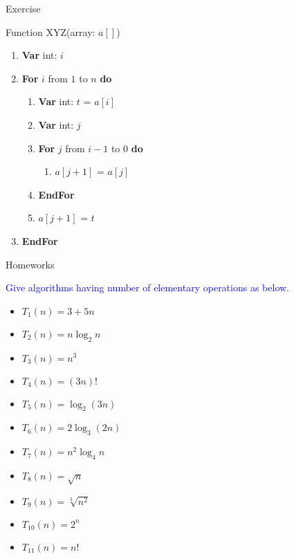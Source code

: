 \documentclass[english,10pt,table]{beamer}
\begin{document}
\begin{frame}{Exercise}
	\begin{block}{Function XYZ(array: $a[]$)}\small				
			\begin{enumerate}[1.]\small				
		   \item {}\textbf{Var} int: \alert{$i$}
     \item {}\textbf{For} \alert{$i$} from \alert{$1$} to \alert{$n$} \textbf{do}
					 \begin{enumerate}[1.]\small				
       \item {}\textbf{Var} int: \alert{$t$} = \alert{$a[i]$}
							\item {}\textbf{Var} int: \alert{$j$}
							\item {}\textbf{For} \alert{$j$} from \alert{$i-1$} to \alert{$0$} \textbf{do}
							 \begin{enumerate}[1.]\small				
         \item {}\alert{$a[j+1]$} = \alert{$a[j]$}
								\end{enumerate}
					  \item \textbf{EndFor}
							\item {}\alert{$a[j+1]$} = \alert{$t$}
						\end{enumerate}
					\item \textbf{EndFor}
			\end{enumerate}
 \end{block}		
\end{frame}



\begin{frame}{Homeworks}
	
	\begin{block}{}\footnotesize
	\textcolor{blue}{Give algorithms having number of elementary operations as below.}\\
	 \begin{itemize}
     \item \alert{$T_1(n) = 3 + 5n$}
					\item \alert{$T_2(n) = n \log_2 n$}
					\item \alert{$T_3(n) = n^3$}
					\item \alert{$T_4(n) = (3n)!$}
					\item \alert{$T_5(n) =  \log_2 (3 n) $}
					\item \alert{$T_6(n) = 2 \log_3 (2 n)$}
					\item \alert{$T_7(n) = n^2 \log_4 n $}
					\item \alert{$T_8(n) = \sqrt{n} $}
					\item \alert{$T_{9}(n) = \sqrt[3]{n^2} $}
					\item \alert{$T_{10}(n) = 2^n $}
					\item \alert{$T_{11}(n) = n! $}
		\end{itemize}
 \end{block}	
\end{frame}
\end{document}
